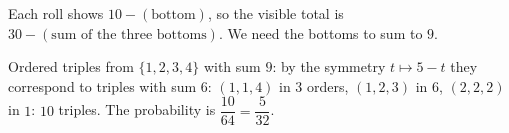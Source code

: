 Each roll shows $10-(\text{bottom})$, so the visible total is $30-(\text{sum of the three bottoms})$. We need the bottoms to sum to $9$.

Ordered triples from $\{1,2,3,4\}$ with sum $9$: by the symmetry $t\mapsto5-t$ they correspond to triples with sum $6$: $(1,1,4)$ in $3$ orders, $(1,2,3)$ in $6$, $(2,2,2)$ in $1$: $10$ triples. The probability is $\dfrac{10}{64}=\boxed{\dfrac5{32}}$.
